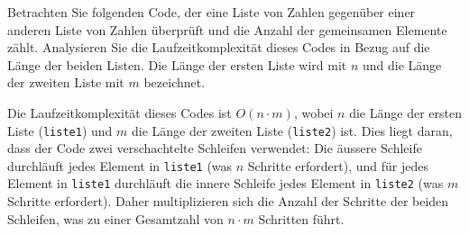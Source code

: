 \begin{mychallenge}
	Betrachten Sie folgenden Code, der eine Liste von Zahlen gegenüber einer anderen Liste von Zahlen überprüft und die Anzahl der gemeinsamen Elemente zählt. Analysieren Sie die Laufzeitkomplexität dieses Codes in Bezug auf die Länge der beiden Listen. Die Länge der ersten Liste wird mit $n$ und die Länge der zweiten Liste mit $m$ bezeichnet.
	
	\begin{myanswer}
		Die Laufzeitkomplexität dieses Codes ist $O(n \cdot m)$, wobei $n$ die Länge der ersten Liste (\lstinline|liste1|) und $m$ die Länge der zweiten Liste (\lstinline|liste2|) ist. Dies liegt daran, dass der Code zwei verschachtelte Schleifen verwendet: Die äussere Schleife durchläuft jedes Element in \lstinline|liste1| (was $n$ Schritte erfordert), und für jedes Element in \lstinline|liste1| durchläuft die innere Schleife jedes Element in \lstinline|liste2| (was $m$ Schritte erfordert). Daher multiplizieren sich die Anzahl der Schritte der beiden Schleifen, was zu einer Gesamtzahl von $n \cdot m$ Schritten führt.
	\end{myanswer}
\end{mychallenge}

